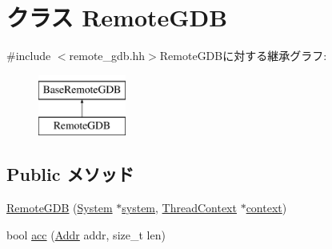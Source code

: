 \hypertarget{classSparcISA_1_1RemoteGDB}{
\section{クラス RemoteGDB}
\label{classSparcISA_1_1RemoteGDB}
}


{\ttfamily \#include $<$remote\_\-gdb.hh$>$}RemoteGDBに対する継承グラフ:\begin{figure}[H]
\begin{center}
\leavevmode
\includegraphics[height=2cm]{classSparcISA_1_1RemoteGDB}
\end{center}
\end{figure}
\subsection*{Public メソッド}
\begin{DoxyCompactItemize}
\item 
\hyperlink{classSparcISA_1_1RemoteGDB_a7d97c5a4edd8630299b2b0521ae32d98}{RemoteGDB} (\hyperlink{classSystem}{System} $\ast$\hyperlink{classBaseRemoteGDB_af27ccd765f13a4b7bd119dc7579e2746}{system}, \hyperlink{classThreadContext}{ThreadContext} $\ast$\hyperlink{classBaseRemoteGDB_a9684dd9218c7836517670f8a0d8f3df7}{context})
\item 
bool \hyperlink{classSparcISA_1_1RemoteGDB_ac4c7be164f087f2f53d137d9768809a7}{acc} (\hyperlink{base_2types_8hh_af1bb03d6a4ee096394a6749f0a169232}{Addr} addr, size\_\-t len)
\end{DoxyCompactItemize}
